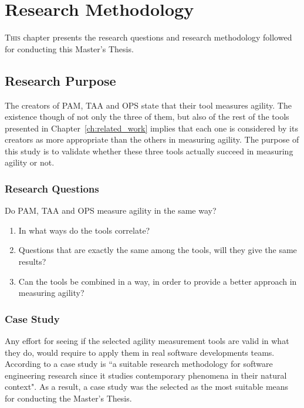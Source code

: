 \chapter{Research Methodology}
\label{ch:research_methodology}


\lettrine[lines=4, loversize=-0.1, lraise=0.1]{T}{his} chapter presents the research questions and research methodology followed for conducting this Master's Thesis.

\section{Research Purpose}
The creators of \ac{PAM}, \ac{TAA} and \ac{OPS} state that their tool measures agility. The existence though of not only the three of them, but also of the rest of the tools presented in Chapter~\ref{ch:related_work} implies that each one is considered by its creators as more appropriate than the others in measuring agility. The purpose of this study is to validate whether these three tools actually succeed in measuring agility or not. 

\subsection{Research Questions}
Do \ac{PAM}, \ac{TAA} and \ac{OPS} measure agility in the same way?

\begin{enumerate}[label={\roman*)},align=left]
  \item In what ways do the tools correlate?
  \item Questions that are exactly the same among the tools, will they give the same results?
  \item Can the tools be combined in a way, in order to provide a better approach in measuring agility?
\end{enumerate}	

\subsection{Case Study}
Any effort for seeing if the selected agility measurement tools are valid in what they do, would require to apply them in real software developments teams. According to \citet{Runeson_Host} a case study is ``a suitable research methodology for software engineering research since it studies contemporary phenomena in their natural context". As a result, a case study was the selected as the most suitable means for conducting the Master's Thesis.  

